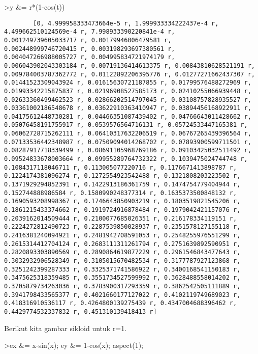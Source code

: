 \documentclass[
]{book}
\begin{document}
\textgreater y \&= r*(1-cos(t))

\begin{verbatim}
        [0, 4.999958333473664e-5 r, 1.999933334222437e-4 r, 
4.499662510124569e-4 r, 7.998933390220841e-4 r, 
0.001249739605033717 r, 0.00179946006479581 r, 
0.002448999746720415 r, 0.003198293697380561 r, 
0.004047266988005727 r, 0.004995834721974179 r, 
0.006043902043303184 r, 0.00719136414613375 r, 0.00843810628521191 r, 
0.009784003787362772 r, 0.01122892206395776 r, 0.01277271662437307 r, 
0.01441523309043924 r, 0.01615630721187855 r, 0.01799576488272969 r, 
0.01993342215875837 r, 0.02196908527585173 r, 0.02410255066939448 r, 
0.02633360499462523 r, 0.02866202514797045 r, 0.03108757828935527 r, 
0.03361002186548678 r, 0.03622910363410947 r, 0.03894456168922911 r, 
0.04175612448730281 r, 0.04466351087439402 r, 0.04766643011428662 r, 
0.05076458191755917 r, 0.0539576564716131 r, 0.05724533447165381 r, 
0.06062728715262111 r, 0.06410317632206519 r, 0.06767265439396564 r, 
0.07133536442348987 r, 0.07509094014268702 r, 0.07893900599711501 r, 
0.08287917718339499 r, 0.08691105968769186 r, 0.09103425032511492 r, 
0.09524833678003664 r, 0.09955289764732322 r, 0.1039475024744748 r, 
0.1084317118046711 r, 0.113005077220716 r, 0.1176671413898787 r, 
0.1224174381096274 r, 0.1272554923542488 r, 0.1321808203223502 r, 
0.1371929294852391 r, 0.1422913186361759 r, 0.1474754779404944 r, 
0.152744888986584 r, 0.1580990248377314 r, 0.1635373500848132 r, 
0.1690593208998367 r, 0.1746643850903219 r, 0.1803519821545206 r, 
0.1861215433374662 r, 0.1919724916878484 r, 0.1979042421157076 r, 
0.2039162014509444 r, 0.2100077685026351 r, 0.216178334119151 r, 
0.2224272812490723 r, 0.2287539850028937 r, 0.2351578127155118 r, 
0.2416381240094921 r, 0.2481942708591053 r, 0.2548255976551299 r, 
0.2615314412704124 r, 0.2683111311261794 r, 0.2751639892590951 r, 
0.2820893303890569 r, 0.2890864619877229 r, 0.2961546843477643 r, 
0.3032932906528349 r, 0.3105015670482534 r, 0.3177787927123868 r, 
0.3251242399287333 r, 0.3325371741586922 r, 0.3400168541150183 r, 
0.3475625318359485 r, 0.3551734527599992 r, 0.3628488558014202 r, 
0.3705879734263036 r, 0.3783900317293359 r, 0.3862542505111889 r, 
0.3941798433565377 r, 0.4021660177127022 r, 0.4102119749689023 r, 
0.418316910536117 r, 0.4264800139275439 r, 0.4347004688396462 r, 
0.4429774532337832 r, 0.451310139418413 r]
\end{verbatim}

Berikut kita gambar sikloid untuk r=1.

\textgreater ex \&= x-sin(x); ey \&= 1-cos(x); aspect(1);
\end{document}
